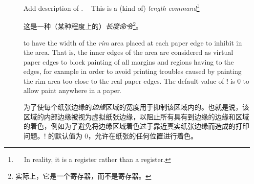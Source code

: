 \begin{description}
\item[\Midx{\!\pagerim!}]\mbox{}\par
{}
{Add description of .}

This is a (kind of) \emph{length command}\footnote{

In reality, it is a  register rather than a  register.}

这是一种（某种程度上的）\emph{长度命令}\footnote{实际上，它是一个寄存器，而不是寄存器。}。

to have the width of the \emph{rim} area placed at each paper edge to 
inhibit \bgpaint{} in the area.  That is, the inner edges of the area are
considered as virtual paper edges to block painting of all margins and
regions having \bginfext{} to the edges, for example in order to
avoid printing troubles caused by painting the rim area too close to the
real paper edges.  The default value of \!\pagerim! is 0 to allow paint
anywhere in a paper.

为了使每个纸张边缘的\emph{边缘}区域的宽度用于抑制该区域内的\bgpaint{}。也就是说，该区域的内部边缘被视为虚拟纸张边缘，以阻止所有具有\bginfext{}到边缘的边缘和区域的着色，例如为了避免将边缘区域着色过于靠近真实纸张边缘而造成的打印问题。\!\pagerim! 的默认值为 0，允许在纸张的任何位置进行着色。
\end{description}
